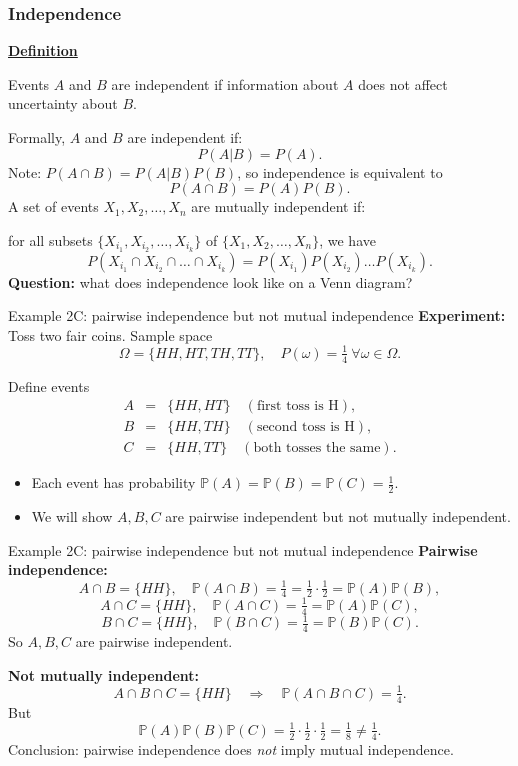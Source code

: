 \documentclass[t,8pt]{beamer}
\begin{document}
\begin{frame}
	\frametitle{Independence}
	{\bf\underline{Definition}} \par
	Events $A$ and $B$ are independent if information about $A$ does not affect uncertainty about $B$. \par
	Formally, $A$ and $B$ are independent if:
	$$P(A\vert B)=P(A).$$
	Note: $P(A\cap B)=P(A\vert B)P(B)$, so independence is equivalent to
	$$P(A\cap B)=P(A)P(B).$$
	A set of events $X_1,X_2,\dots,X_n$ are mutually independent if: \par 
	for all subsets $\{X_{i_1},X_{i_2},\dots,X_{i_k}\}$ of $\{X_1,X_2,\dots,X_n\}$, we have
	$$P(X_{i_1}\cap X_{i_2}\cap\dots\cap X_{i_k})=P(X_{i_1})P(X_{i_2})\dots P(X_{i_k}).$$
	{\bf Question:} what does independence look like on a Venn diagram?
\end{frame}

\begin{frame}{Example 2C: pairwise independence but not mutual independence}
	\textbf{Experiment:} Toss two fair coins. Sample space
	\[
	\Omega = \{HH, HT, TH, TT\}, \quad P(\omega)=\tfrac14\ \forall \omega\in\Omega.
	\]
	
	Define events
	\begin{eqnarray}
		A &=& \{HH, HT\} \quad (\text{first toss is H}),\nonumber\\
		B &=& \{HH, TH\} \quad (\text{second toss is H}),\nonumber\\
		C &=& \{HH, TT\} \quad (\text{both tosses the same}).\nonumber
	\end{eqnarray}
	
	\begin{itemize}
		\item Each event has probability $\mathbb{P}(A)=\mathbb{P}(B)=\mathbb{P}(C)=\tfrac12$.
		\item We will show $A,B,C$ are pairwise independent but not mutually independent.
	\end{itemize}
\end{frame}

\begin{frame}{Example 2C: pairwise independence but not mutual independence}
	\textbf{Pairwise independence:}
	\[
	A \cap B = \{HH\}, \quad \mathbb{P}(A \cap B) = \tfrac14 = \tfrac12 \cdot \tfrac12 = \mathbb{P}(A)\mathbb{P}(B),
	\]
	\[
	A \cap C = \{HH\}, \quad \mathbb{P}(A \cap C) = \tfrac14 = \mathbb{P}(A)\mathbb{P}(C),
	\]
	\[
	B \cap C = \{HH\}, \quad \mathbb{P}(B \cap C) = \tfrac14 = \mathbb{P}(B)\mathbb{P}(C).
	\]
	So $A,B,C$ are pairwise independent.
	
	\bigskip
	\textbf{Not mutually independent:}
	\[
	A \cap B \cap C = \{HH\} \quad \Rightarrow \quad \mathbb{P}(A \cap B \cap C) = \tfrac14.
	\]
	But
	\[
	\mathbb{P}(A)\mathbb{P}(B)\mathbb{P}(C) = \tfrac12 \cdot \tfrac12 \cdot \tfrac12 = \tfrac18 \neq \tfrac14.
	\]
	\alert{Conclusion:} pairwise independence does \emph{not} imply mutual independence.
\end{frame}
\end{document}
